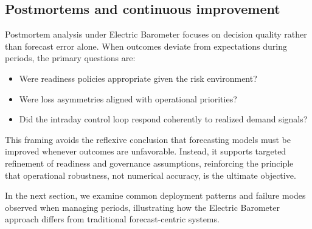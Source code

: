 \subsection{Postmortems and continuous improvement}
\label{subsec:postmortems}

Postmortem analysis under Electric Barometer focuses on decision quality rather than forecast error
alone. When outcomes deviate from expectations during \LTO{} periods, the primary questions are:
\begin{itemize}[leftmargin=*, itemsep=2pt]
  \item Were readiness policies appropriate given the risk environment?
  \item Were loss asymmetries aligned with operational priorities?
  \item Did the intraday control loop respond coherently to realized demand signals?
\end{itemize}

This framing avoids the reflexive conclusion that forecasting models must be improved whenever
outcomes are unfavorable. Instead, it supports targeted refinement of readiness and governance
assumptions, reinforcing the principle that operational robustness, not numerical accuracy, is the
ultimate objective.

In the next section, we examine common deployment patterns and failure modes observed when
managing \LTO{} periods, illustrating how the Electric Barometer approach differs from traditional
forecast-centric systems.
